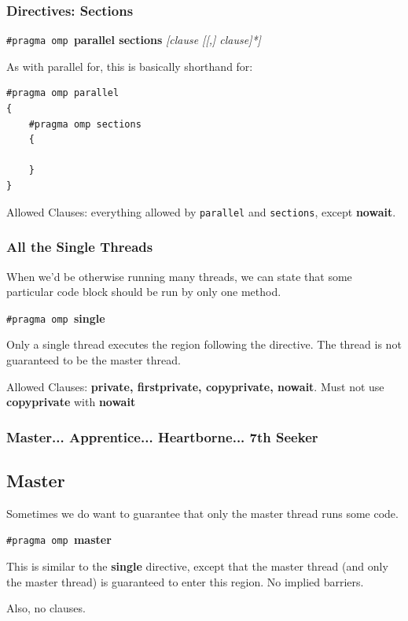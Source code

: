 \begin{frame}[fragile]
\frametitle{Directives: Sections}

 \begin{center}
    {\tt \#pragma omp }{\bf parallel sections} {\it [clause [[,] clause]*]}
  \end{center}

  As with parallel for, this is basically shorthand for:
  
  \begin{lstlisting}
#pragma omp parallel
{
    #pragma omp sections
    {

    }
}
  \end{lstlisting}

  Allowed Clauses: everything allowed by {\tt parallel} and {\tt sections}, except
  {\bf nowait}.


\end{frame}

\begin{frame}
\frametitle{All the Single Threads}

When we'd be otherwise running many threads, we can state
that some particular code block should be run by only one method.

  \begin{center}
    {\tt \#pragma omp }{\bf single}
  \end{center}
    Only a single thread executes the region following the directive.
    The thread is not guaranteed to be the master thread.

  Allowed Clauses: {\bf private, firstprivate, copyprivate, nowait}.
 Must not use {\bf copyprivate} with {\bf nowait}



\end{frame}


\begin{frame}
\frametitle{Master... Apprentice... Heartborne... 7th Seeker}

  \subsection*{Master} Sometimes we do want to guarantee that only the master
thread runs some code.
  \begin{center}
    {\tt \#pragma omp }{\bf master}
  \end{center}

    This is similar to the {\bf single} directive, except that the master thread (and only the master thread) is guaranteed to enter this region.
    No implied barriers. 

Also, no clauses.

\end{frame}


